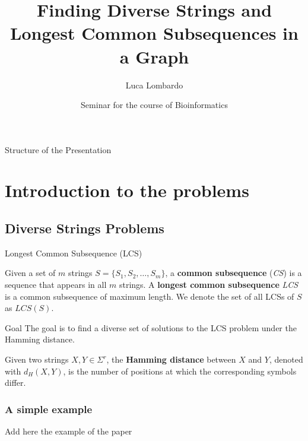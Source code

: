 \documentclass{beamer}
\title{Finding Diverse Strings and Longest Common Subsequences in a Graph}
\author{Luca Lombardo}
\date{Seminar for the course of Bioinformatics}
\begin{document}
\begin{frame}
    \titlepage
\end{frame}


\begin{frame}{Structure of the Presentation}
    \tableofcontents
\end{frame}

\section{Introduction to the problems}
\subsection{Diverse Strings Problems}
\begin{frame}{Longest Common Subsequence (LCS)}
\begin{definition}
    Given a set of $m$ strings $S = \{ S_1, S_2, \ldots, S_m \}$, a \textbf{common subsequence} (\emph{CS}) is a sequence that appears in all $m$ strings. A \textbf{longest common subsequence} \emph{LCS} is a common subsequence of maximum length. We denote the set of all LCSs of $S$ as $LCS(S)$.
\end{definition}
\begin{alertblock}{Goal}
    The goal is to find a diverse set of solutions to the LCS problem under the Hamming distance.
\end{alertblock}
\begin{definition}
    Given two strings $X, Y \in \Sigma^r$, the \textbf{Hamming distance} between $X$ and $Y$, denoted with $d_H(X,Y)$, is the number of positions at which the corresponding symbols differ.
\end{definition}
\end{frame}



\begin{frame}
    \frametitle{A simple example}
    Add here the example of the paper


\end{frame}
\end{document}
